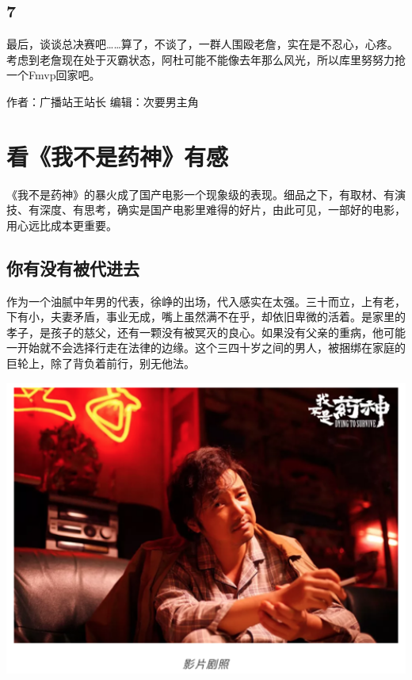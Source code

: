\documentclass[
]{book}
\begin{document}
\hypertarget{section-5}{%
\subsection{7}\label{section-5}}

最后，谈谈总决赛吧\ldots\ldots 算了，不谈了，一群人围殴老詹，实在是不忍心，心疼。考虑到老詹现在处于灭霸状态，阿杜可能不能像去年那么风光，所以库里努努力抢一个Fmvp回家吧。

作者：广播站王站长
编辑：次要男主角

\hypertarget{ux770bux6211ux4e0dux662fux836fux795eux6709ux611f}{%
\section{看《我不是药神》有感}\label{ux770bux6211ux4e0dux662fux836fux795eux6709ux611f}}

《我不是药神》的暴火成了国产电影一个现象级的表现。细品之下，有取材、有演技、有深度、有思考，确实是国产电影里难得的好片，由此可见，一部好的电影，用心远比成本更重要。

\hypertarget{ux4f60ux6709ux6ca1ux6709ux88abux4ee3ux8fdbux53bb}{%
\subsection{你有没有被代进去}\label{ux4f60ux6709ux6ca1ux6709ux88abux4ee3ux8fdbux53bb}}

作为一个油腻中年男的代表，徐峥的出场，代入感实在太强。三十而立，上有老，下有小，夫妻矛盾，事业无成，嘴上虽然满不在乎，却依旧卑微的活着。是家里的孝子，是孩子的慈父，还有一颗没有被冥灭的良心。如果没有父亲的重病，他可能一开始就不会选择行走在法律的边缘。这个三四十岁之间的男人，被捆绑在家庭的巨轮上，除了背负着前行，别无他法。

\includegraphics[width=6.67in]{images/yaoshen1}
\end{document}
